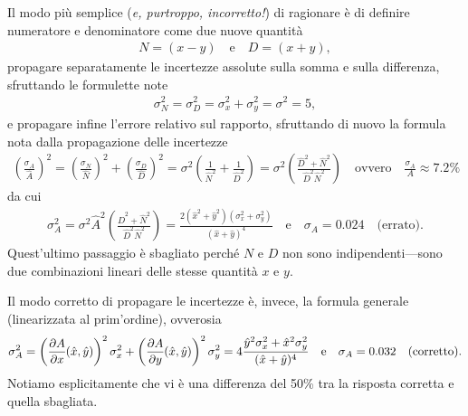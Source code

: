 Il modo più semplice (\emph{e, purtroppo, incorretto!}) di ragionare è di
definire numeratore e denominatore come due nuove quantità
\begin{align*}
  N = (x - y) \quad \text{e} \quad D = (x + y),
\end{align*}
propagare separatamente le incertezze assolute sulla somma e sulla differenza,
sfruttando le formulette note
\begin{align*}
  \sigma^2_N = \sigma^2_D = \sigma^2_x + \sigma^2_y = \sigma^2 = 5,
\end{align*}
e propagare infine l'errore relativo sul rapporto, sfruttando di nuovo la formula
nota dalla propagazione delle incertezze
\begin{align*}
  \left(\frac{\sigma_A}{\hat{A}}\right)^2 =
  \left(\frac{\sigma_N}{\hat{N}}\right)^2 + \left(\frac{\sigma_D}{\hat{D}}\right)^2 =
  \sigma^2 \left( \frac{1}{\hat{N}^2} + \frac{1}{\hat{D}^2} \right) =
  \sigma^2 \left( \frac{\hat{D}^2 + \hat{N}^2}{\hat{D}^2\hat{N}^2} \right)
  \quad \text{ovvero} \quad \frac{\sigma_A}{A} \approx 7.2\%
\end{align*}
da cui
\begin{align*}
  \sigma^2_A = \sigma^2 \hat{A}^2 \left( \frac{\hat{D}^2 + \hat{N}^2}{\hat{D}^2\hat{N}^2} \right) =
  \frac{2\left(\hat{x}^2 + \hat{y}^2\right) \left(\sigma^2_x + \sigma^2_y\right)}{(\hat{x} + \hat{y})^4}
  \quad \text{e} \quad \sigma_A = 0.024 \quad \text{(errato)}.
\end{align*}
Quest'ultimo passaggio è sbagliato perché $N$ e $D$ non sono indipendenti---sono
due combinazioni lineari delle stesse quantità $x$ e $y$.

Il modo corretto di propagare le incertezze è, invece, la formula generale
(linearizzata al prim'ordine), ovverosia
\begin{align*}
  \sigma^2_A = \left( \pd{A}{x}{\hat{x}, \hat{y}} \right)^2 \sigma^2_x +
  \left( \pd{A}{y}{\hat{x}, \hat{y}} \right)^2 \sigma^2_y =
  4 \frac{\hat{y}^2\sigma^2_x + \hat{x}^2\sigma^2_y}{(\hat{x} + \hat{y})^4}
  \quad \text{e} \quad \sigma_A = 0.032 \quad \text{(corretto)}.
\end{align*}
Notiamo esplicitamente che vi è una differenza del 50\% tra la risposta corretta
e quella sbagliata.
